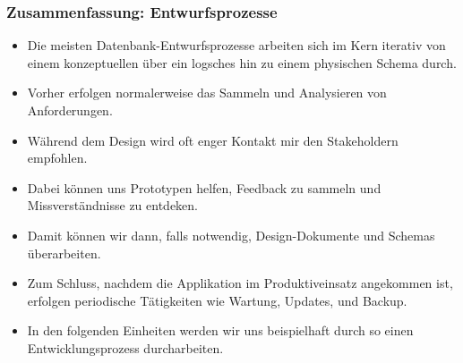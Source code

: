 \documentclass[aspectratio=169,mathserif,notheorems]{beamer}%
\begin{document}
\begin{frame}%
\frametitle{Zusammenfassung: Entwurfsprozesse}%
\begin{itemize}%
%
\item Die meisten Datenbank-Entwurfsprozesse arbeiten sich im Kern iterativ von einem konzeptuellen über ein logsches hin zu einem physischen Schema durch.%
%
\item<2-> Vorher erfolgen normalerweise das Sammeln und Analysieren von Anforderungen.%
%
\item<3-> Während dem Design wird oft enger Kontakt mir den Stakeholdern empfohlen.%
%
\item<4-> Dabei können uns Prototypen helfen, Feedback zu sammeln und Missverständnisse zu entdeken.%
%
\item<5-> Damit können wir dann, falls notwendig, Design-Dokumente und Schemas überarbeiten.%
%
\item<6-> Zum Schluss, nachdem die Applikation im Produktiveinsatz angekommen ist, erfolgen periodische Tätigkeiten wie Wartung, Updates, und Backup.%
%
\item<7-> In den folgenden Einheiten werden wir uns beispielhaft durch so einen Entwicklungsprozess durcharbeiten.%
\end{itemize}%
\end{frame}
%
\endPresentation%
\end{document}
